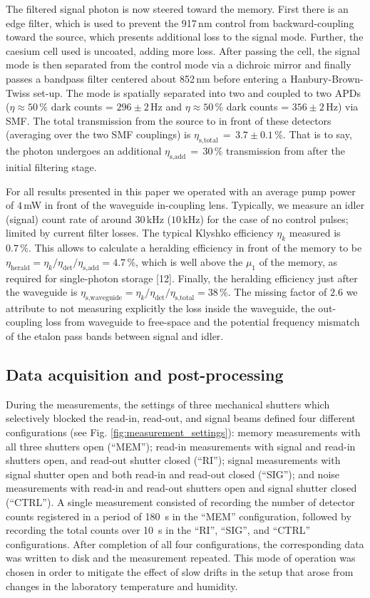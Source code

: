 \documentclass[%
 reprint,
 amsmath,amssymb,
 aps,
 pra,
]{revtex4-1}
\begin{document}
The filtered signal photon is now steered toward the memory. First there is an edge filter, which is used to prevent the 917$\,$nm control from backward-coupling toward the source, which presents additional loss to the signal mode. Further, the caesium cell used is uncoated, adding more loss. After passing the cell, the signal mode is then separated from the control mode via a dichroic mirror and finally passes a bandpass filter centered about 852$\,$nm before entering a Hanbury-Brown-Twiss set-up. The mode is spatially separated into two and coupled to two APDs ($\eta\approx50\,\%$ dark counts = $296 \pm 2\,$Hz and $\eta\approx50\,\%$ dark counts = $356 \pm 2\,$Hz) via SMF. The total transmission from the source to in front of these detectors (averaging over the two SMF couplings) is $\eta_\textrm{s,total}\,=\,3.7\pm0.1\,\%$. That is to say, the photon undergoes an additional $\eta_\textrm{s,add}\,=\,30\,\%$ transmission from after the initial filtering stage.

For all results presented in this paper we operated with an average pump power of $4\,$mW in front of the waveguide in-coupling lens. Typically, we measure an idler (signal) count rate of around $30\,$kHz ($10\,$kHz) for the case of no control pulses; limited by current filter losses. The typical Klyshko efficiency $\eta_k$ measured is $0.7\,\%$. This allows to calculate a heralding efficiency in front of the memory to be $\eta_\textrm{herald} = \eta_k/\eta_{\textrm{det}}/\eta_\textrm{s,add} = 4.7\,\%$, which is well above the $\mu_1$ of the memory, as required for single-photon storage [12]. Finally, the heralding efficiency just after the waveguide is $\eta_\textrm{s,waveguide} = \eta_k/\eta_{\textrm{det}}/\eta_\textrm{s,total} = 38\,\%$. The missing factor of $2.6$ we attribute to not measuring explicitly the loss inside the waveguide, the out-coupling loss from waveguide to free-space and the potential frequency mismatch of the etalon pass bands between signal and idler.

\subsection{Data acquisition and post-processing}
During the measurements, the settings of three mechanical shutters which selectively blocked the read-in, read-out, and signal beams defined four different configurations (see Fig. \ref{fig:measurement_settings}): memory measurements with all three shutters open (``MEM''); read-in measurements with signal and read-in shutters open, and read-out shutter closed (``RI''); signal measurements with signal shutter open and both read-in and read-out closed (``SIG''); and noise measurements with read-in and read-out shutters open and signal shutter closed (``CTRL''). A single measurement consisted of recording the number of detector counts registered in a period of 180~s in the ``MEM'' configuration, followed by recording the total counts over 10~s in the ``RI'', ``SIG'', and ``CTRL'' configurations. After completion of all four configurations, the corresponding data was written to disk and the measurement repeated. This mode of operation was chosen in order to mitigate the effect of slow drifts in the setup that arose from changes in the laboratory temperature and humidity.
\end{document}
